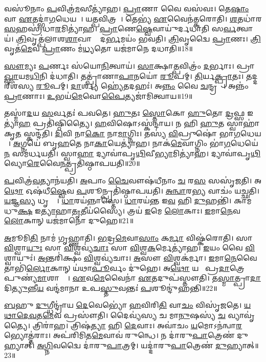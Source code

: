 𑌵𑌸𑍂॑𑌨𑌾𑌂 \ul{𑌪}𑌵𑌿𑌤𑍍𑌰॑\ul{𑌮}𑌸𑍀𑌤𑍍𑌯𑌾॑𑌹।
\ul{𑌪𑍍𑌰𑌾}𑌣𑌾 𑌵𑍈 𑌵𑌸॑𑌵𑌃।
𑌤𑍇\ul{𑌷𑌾𑌂} 𑌵𑌾 \ul{𑌏}𑌤𑌦𑍍𑌭𑌾॑\ul{𑌗}𑌧𑍇𑌯𑌮𑍍᳚।
𑌯\ul{𑌤𑍍𑌪}𑌵𑌿𑌤𑍍𑌰𑌮𑍍᳚।
𑌤𑍇𑌭𑍍𑌯॑ \ul{𑌏}𑌵𑍈𑌨॑𑌤𑍍𑌕𑌰𑍋𑌤𑌿।
\ul{𑌶}𑌤𑌧𑌾॑𑌰 \ul{𑌸}𑌹𑌸𑍍𑌰॑𑌧𑌾\ul{𑌰}𑌮𑌿𑌤𑍍𑌯𑌾॑𑌹।
\ul{𑌪𑍍𑌰𑌾}𑌣𑍇\ul{𑌷𑍍𑌵𑍇}𑌵𑌾𑌯𑍁॑𑌰𑍍𑌦𑌧𑌾𑌤𑌿 𑌸\ul{𑌰𑍍𑌵}𑌤𑍍𑌵𑌾𑌯॑।
\ul{𑌤𑍍𑌰𑌿}𑌵𑍃𑌤𑍍𑌪॑𑌲𑌾𑌶\ul{𑌶𑌾}𑌖𑌾𑌯𑌾𑌂᳚ 𑌦\ul{𑌰𑍍𑌭}𑌮𑌯𑌂॑ 𑌭𑌵𑌤𑌿।
\ul{𑌤𑍍𑌰𑌿}𑌵𑍃𑌦𑍍𑌵𑍈 \ul{𑌪𑍍𑌰𑌾}𑌣𑌃।
\ul{𑌤𑍍𑌰𑌿}𑌵𑍃𑌤॑\ul{𑌮𑍇}𑌵 \ul{𑌪𑍍𑌰𑌾}𑌣𑌂 𑌮॑\ul{𑌧𑍍𑌯}𑌤𑍋 𑌯𑌜॑𑌮𑌾𑌨𑍇 𑌦𑌧𑌾𑌤𑌿॥18॥

\ul{𑌸𑍗}𑌮𑍍𑌯𑌃 \ul{𑌪}𑌰𑍍𑌣𑌃 𑌸॑𑌯𑍋\ul{𑌨𑌿}𑌤𑍍𑌵𑌾𑌯॑।
\ul{𑌸𑌾}𑌕𑍍𑌷𑌾\ul{𑌤𑍍𑌪}𑌵𑌿𑌤𑍍𑌰𑌂॑ \ul{𑌦}𑌰𑍍𑌭𑌾𑌃।
𑌪𑍍𑌰𑌾\ul{𑌖𑍍𑌸𑌾}𑌯𑌮\ul{𑌧𑌿}𑌨𑌿 𑌦॑𑌧𑌾𑌤𑌿।
𑌤𑌤𑍍𑌪𑍍𑌰𑌾॑𑌣𑌾\ul{𑌪𑌾}𑌨𑌯𑍋॑ \ul{𑌰𑍂}𑌪𑌮𑍍।
\ul{𑌤𑌿}𑌰𑍍𑌯\ul{𑌕𑍍𑌪𑍍𑌰𑌾}𑌤𑌃।
𑌤𑌦𑍍𑌦𑌰𑍍‌𑌶॑𑌸𑍍𑌯 \ul{𑌰𑍂}𑌪𑌮𑍍।
\ul{𑌦𑌾}𑌰𑍍𑌶𑍍𑌯 𑌹𑍍𑌯𑍇॑𑌤𑌦𑌹𑌃॑।
𑌅\ul{𑌨𑍍𑌨𑌂} 𑌵𑍈 \ul{𑌚}𑌨𑍍𑌦𑍍𑌰𑌮𑌾𑌃᳚।
𑌅𑌨𑍍𑌨𑌂॑ \ul{𑌪𑍍𑌰𑌾}𑌣𑌾𑌃।
\ul{𑌉}𑌭𑌯॑\ul{𑌮𑍇}𑌵𑍋\ul{𑌪𑍈}𑌤𑍍𑌯𑌜𑌾॑𑌮𑌿𑌤𑍍𑌵𑌾𑌯॥19॥

𑌤𑌸𑍍𑌮𑌾॑\ul{𑌦}𑌯 \ul{𑌸}𑌰𑍍𑌵𑌤𑌃॑ 𑌪𑌵𑌤𑍇।
\ul{𑌹𑍁}𑌤𑌃 \ul{𑌸𑍍𑌤𑍋}𑌕𑍋 \ul{𑌹𑍁}𑌤𑍋 \ul{𑌦𑍍𑌰}𑌫𑍍𑌸 𑌇𑌤𑍍𑌯𑌾॑\ul{𑌹} 𑌪𑍍𑌰𑌤𑌿॑\-𑌷𑍍𑌠𑌿𑌤𑍍𑌯𑍈।
\ul{𑌹}𑌵𑌿𑌷𑍋\-𑌽𑌸𑍍𑌕॑𑌨𑍍𑌦𑌾𑌯।
𑌨 𑌹𑌿 \ul{𑌹𑍁}𑌤 𑌸𑍍𑌵𑌾𑌹𑌾॑𑌕𑍃\ul{𑌤}\ul{} 𑌸𑍍𑌕𑌨𑍍𑌦॑𑌤𑌿।
\ul{𑌦𑌿}𑌵𑌿 𑌨𑌾\ul{𑌕𑍋} 𑌨𑌾\ul{𑌮𑌾}𑌗𑍍𑌨𑌿𑌃।
𑌤𑌸𑍍𑌯॑ \ul{𑌵𑌿}𑌪𑍍𑌰𑍁𑌷𑍋॑ 𑌭𑌾\ul{𑌗}𑌧𑍇𑌯𑌮𑍍᳚।
\ul{𑌅}𑌗𑍍𑌨𑌯𑍇॑ 𑌬𑍃\ul{𑌹}𑌤𑍇 𑌨𑌾\ul{𑌕𑌾}𑌯𑍇𑌤𑍍𑌯𑌾॑𑌹।
𑌨𑌾𑌕॑\ul{𑌮𑍇}𑌵𑌾𑌗𑍍𑌨𑌿𑌂 𑌭𑌾॑\ul{𑌗}𑌧𑍇𑌯𑍇॑\ul{𑌨} 𑌸𑌮॑𑌰𑍍𑌧𑌯𑌤𑌿।
𑌸𑍍𑌵𑌾\ul{𑌹𑌾} 𑌦𑍍𑌯𑌾𑌵𑌾॑𑌪𑍃\ul{𑌥𑌿}𑌵𑍀\ul{𑌭𑍍𑌯𑌾}𑌮𑌿𑌤𑍍𑌯𑌾॑𑌹।
𑌦𑍍𑌯𑌾𑌵𑌾॑𑌪𑍃\ul{𑌥𑌿}𑌵𑍍𑌯𑍋\ul{𑌰𑍇}𑌵𑍈\ul{𑌨}𑌤𑍍𑌪𑍍𑌰𑌤𑌿॑\-𑌷𑍍𑌠𑌾𑌪𑌯𑌤𑌿॥20॥

\ul{𑌪}𑌵𑌿𑌤𑍍𑌰॑\ul{𑌵}𑌤𑍍𑌯𑌾𑌨॑𑌯𑌤𑌿।
\ul{𑌅}𑌪𑌾𑌂 \ul{𑌚𑍈}𑌵𑍗𑌷॑𑌧𑍀𑌨𑌾𑌂 \ul{𑌚} 𑌰\ul{𑌸}\ul{} 𑌸𑌸𑍃॑𑌜𑌤𑌿।
𑌅\ul{𑌥𑍋} 𑌓𑌷॑𑌧𑍀\ul{𑌷𑍍𑌵𑍇}𑌵 \ul{𑌪}𑌶𑍂𑌨𑍍𑌪𑍍𑌰𑌤𑌿॑\-𑌷𑍍𑌠𑌾𑌪𑌯𑌤𑌿।
\ul{𑌅}\ul{𑌨𑍍𑌵𑌾}𑌰\ul{𑌭𑍍𑌯} 𑌵𑌾𑌚𑌂॑ 𑌯𑌚𑍍𑌛𑌤𑌿।
\ul{𑌯}𑌜𑍍𑌞\ul{𑌸𑍍𑌯} 𑌧𑍃𑌤𑍍𑌯𑍈᳚।
\ul{𑌧𑌾}𑌰𑌯॑𑌨𑍍𑌨𑌾𑌸𑍍𑌤𑍇।
\ul{𑌧𑌾}𑌰𑌯॑𑌨𑍍𑌤 𑌇\ul{𑌵} 𑌹𑌿 \ul{𑌦𑍁}𑌹𑌨𑍍𑌤𑌿॑।
𑌕𑌾𑌮॑𑌧𑍁\ul{𑌕𑍍𑌷} 𑌇\ul{𑌤𑍍𑌯𑌾}𑌹𑌾\ul{𑌤𑍃}𑌤𑍀𑌯॑𑌸𑍍𑌯𑍈।
𑌤𑍍𑌰𑌯॑ \ul{𑌇}𑌮𑍇 \ul{𑌲𑍋}𑌕𑌾𑌃।
\ul{𑌇}𑌮𑌾\ul{𑌨𑍇}𑌵 \ul{𑌲𑍋}𑌕𑌾𑌨𑍍 ‌𑌯𑌜॑𑌮𑌾𑌨𑍋 𑌦𑍁𑌹𑍇॥21॥

\ul{𑌅}𑌮𑍂𑌮𑌿\ul{𑌤𑌿} 𑌨𑌾𑌮॑ 𑌗𑍃𑌹𑍍𑌣𑌾𑌤𑌿।
\ul{𑌭}𑌦𑍍𑌰\ul{𑌮𑍇}𑌵𑌾\ul{𑌸𑌾𑌂} 𑌕\ul{𑌰𑍍𑌮𑌾} 𑌵𑌿𑌷𑍍𑌕॑𑌰𑍋𑌤𑌿।
𑌸𑌾 \ul{𑌵𑌿}𑌶𑍍𑌵𑌾\ul{𑌯𑍁𑌃} 𑌸𑌾 \ul{𑌵𑌿}𑌶𑍍𑌵𑌵𑍍𑌯॑\ul{𑌚𑌾𑌃} 𑌸𑌾 \ul{𑌵𑌿}𑌶𑍍𑌵\ul{𑌕}𑌰𑍍𑌮𑍇𑌤𑍍𑌯𑌾॑𑌹।
\ul{𑌇}𑌯𑌂 𑌵𑍈 \ul{𑌵𑌿}𑌶𑍍𑌵𑌾𑌯𑍁𑌃॑।
\ul{𑌅}𑌨𑍍𑌤𑌰𑌿॑𑌕𑍍𑌷𑌂 \ul{𑌵𑌿}𑌶𑍍𑌵𑌵𑍍𑌯॑𑌚𑌾𑌃।
\ul{𑌅}𑌸𑍗 \ul{𑌵𑌿}𑌶𑍍𑌵𑌕॑𑌰𑍍𑌮𑌾।
\ul{𑌇}𑌮𑌾\ul{𑌨𑍇}𑌵𑍈𑌤𑌾𑌭𑌿॑\ul{𑌰𑍍𑌲𑍋}𑌕𑌾𑌨𑍍‌ 𑌯॑𑌥𑌾\ul{𑌪𑍂}𑌰𑍍𑌵𑌂 𑌦𑍁॑𑌹𑍇।
𑌅\ul{𑌥𑍋} 𑌯𑌥𑌾᳚ 𑌪𑍍𑌰\ul{𑌦𑌾}𑌤𑍍𑌰𑍇 𑌪𑍁𑌣𑍍𑌯॑\ul{𑌮𑌾}𑌶𑌾𑌸𑍍𑌤𑍇᳚।
\ul{𑌏}𑌵\ul{𑌮𑍇}𑌵𑍈𑌨𑌾॑ \ul{𑌏}𑌤𑌦𑍁𑌪॑𑌸𑍍𑌤𑍗𑌤𑌿।
𑌤\ul{𑌸𑍍𑌮𑌾}𑌤𑍍𑌪𑍍𑌰𑌾\ul{𑌦𑌾}𑌦𑌿\ul{𑌤𑍍𑌯𑍁}𑌨𑍍𑌨𑍀\ul{𑌯} 𑌵𑌨𑍍𑌦॑𑌮𑌾𑌨𑌾 𑌉𑌪\ul{𑌸𑍍𑌤𑍁}𑌵𑌨𑍍𑌤𑌃॑ \ul{𑌪}𑌶𑍂𑌨𑍍𑌦𑍁॑\-𑌹𑌨𑍍𑌤𑌿॥22॥

\ul{𑌬}𑌹𑍁 \ul{𑌦𑍁}𑌗𑍍𑌧𑍀𑌨𑍍𑌦𑍍𑌰𑌾॑𑌯 \ul{𑌦𑍇}𑌵𑍇𑌭𑍍𑌯𑍋॑ \ul{𑌹}𑌵𑌿𑌰𑌿\ul{𑌤𑌿} 𑌵𑌾\ul{𑌚𑌂} 𑌵𑌿𑌸𑍃॑𑌜𑌤𑍇।
\ul{𑌯}\ul{𑌥𑌾}\ul{𑌦𑍇}\ul{𑌵}𑌤\ul{𑌮𑍇}𑌵 𑌪𑍍𑌰𑌸𑍗॑𑌤𑌿।
𑌦𑍈𑌵𑍍𑌯॑𑌸𑍍𑌯 𑌚 𑌮𑌾\ul{𑌨𑍁}𑌷𑌸𑍍𑌯॑ \ul{𑌚} 𑌵𑍍𑌯𑌾𑌵𑍃॑𑌤𑍍𑌯𑍈।
𑌤𑍍𑌰𑌿𑌰𑌾॑𑌹।
𑌤𑍍𑌰𑌿𑌷॑\ul{𑌤𑍍𑌯𑌾} 𑌹𑌿 \ul{𑌦𑍇}𑌵𑌾𑌃।
𑌅𑌵𑌾॑𑌚𑌂 \ul{𑌯}𑌮𑍋\-𑌽𑌨॑𑌨𑍍𑌵𑌾\ul{𑌰}𑌭𑍍𑌯𑍋𑌤𑍍𑌤॑𑌰𑌾𑌃।
𑌅𑌪॑𑌰𑌿𑌮𑌿𑌤\ul{𑌮𑍇}𑌵𑌾𑌵॑ 𑌰𑍁𑌨𑍍𑌧𑍇।
𑌨 𑌦𑌾॑𑌰𑍁\ul{𑌪𑌾}𑌤𑍍𑌰𑍇𑌣॑ 𑌦𑍁𑌹𑍍𑌯𑌾𑌤𑍍।
\ul{𑌅}\ul{𑌗𑍍𑌨𑌿}𑌵𑌦𑍍𑌵𑍈 𑌦𑌾॑𑌰𑍁\ul{𑌪𑌾}𑌤𑍍𑌰𑌮𑍍।
𑌯𑌦𑍍𑌦𑌾॑𑌰𑍁\ul{𑌪𑌾}𑌤𑍍𑌰𑍇𑌣॑ \ul{𑌦𑍁}𑌹𑍍𑌯𑌾𑌤𑍍॥23॥


